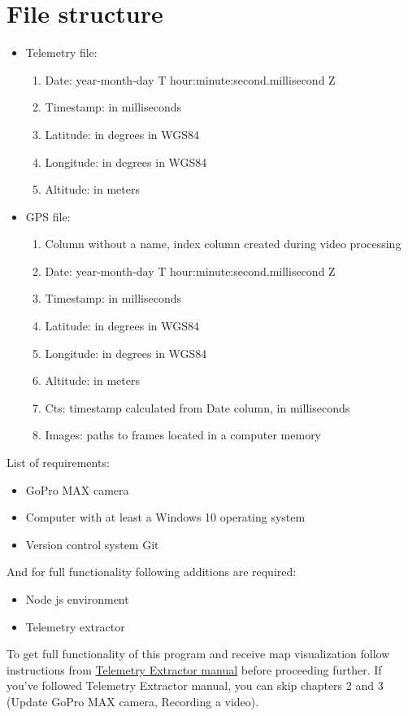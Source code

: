 \documentclass[a4paper,12pt]{book}
\begin{document}
\section{File structure}
\begin{itemize}
	\item Telemetry file:
	\begin{enumerate}
		\item Date: year-month-day T hour:minute:second.millisecond Z
		\item Timestamp: in milliseconds
		\item Latitude: in degrees in WGS84
		\item Longitude: in degrees in WGS84
		\item Altitude: in meters
	\end{enumerate}
	
	\item GPS file:
	\begin{enumerate}
		\item Column without a name, index column created during video processing
		\item Date: year-month-day T hour:minute:second.millisecond Z
		\item Timestamp: in milliseconds
		\item Latitude: in degrees in WGS84
		\item Longitude: in degrees in WGS84
		\item Altitude: in meters
		\item Cts: timestamp calculated from Date column, in milliseconds
		\item Images: paths to frames located in a computer memory
	\end{enumerate}
\end{itemize}

\pagebreak
List of requirements:
\begin{itemize}
	\item GoPro MAX camera
	\item Computer with at least a Windows 10 operating system
	\item Version control system Git
\end{itemize}
And for full functionality following additions are required:
\begin{itemize}
	\item Node js environment
	\item Telemetry extractor
\end{itemize}
To get full functionality of this program and receive map visualization follow instructions from \href{https://github.com/miloszwojciechowski/Open-vslam-project/tree/main/Manuals/Telemetry_extractor}{Telemetry Extractor manual} before proceeding further. If you've followed Telemetry Extractor manual, you can skip chapters 2 and 3 (Update GoPro MAX camera, Recording a video).
\end{document}
